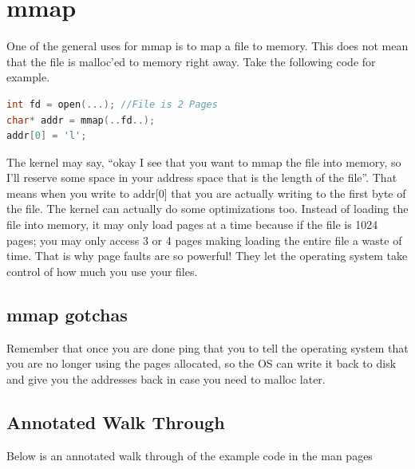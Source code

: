 \section{mmap}

One of the general uses for mmap is to map a file to memory. This does not mean that the file is malloc'ed to memory right away. Take the following code for example.

\begin{lstlisting}[language=C]
int fd = open(...); //File is 2 Pages
char* addr = mmap(..fd..);
addr[0] = 'l';
\end{lstlisting}

The kernel may say, ``okay I see that you want to mmap the file into memory, so I'll reserve some space in your address space that is the length of the file''. That means when you write to addr{[}0{]} that you are actually writing to the first byte of the file. The kernel can actually do some optimizations too. Instead of loading the file into memory, it may only load pages at a time because if the file is 1024 pages; you may only access 3 or 4 pages making loading the entire file a waste of time. That is why page faults are so powerful! They let the operating system take control of how much you use your files.

\subsection{mmap gotchas}

 Remember that once you are done ping that you  to tell the operating system that you are no longer using the pages allocated, so the OS can write it back to disk and give you the addresses back in case you need to malloc later.

 \subsection{Annotated Walk Through}

 Below is an annotated walk through of the example code in the man pages

